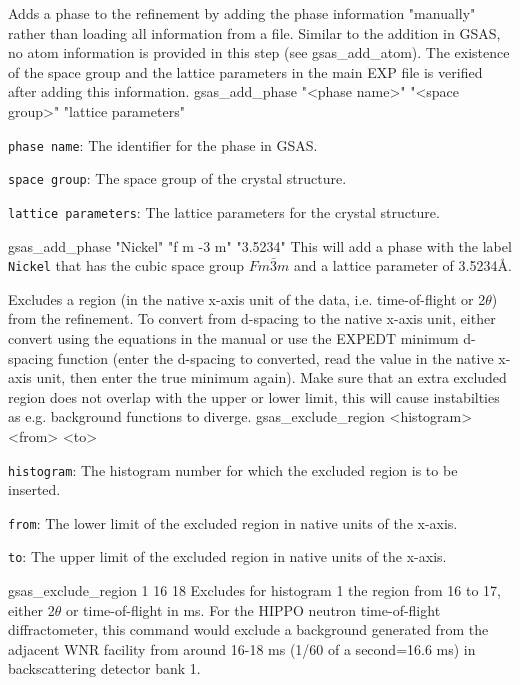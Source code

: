 {
Adds a phase to the refinement by adding the phase information "manually" rather than loading all information from a file. Similar to the addition in GSAS, no atom information is provided in this step (see gsas\_add\_atom). The existence of the space group and the lattice parameters in the main EXP file is verified after adding this information.
}{
gsas\_add\_phase "<phase name>" "<space group>" "lattice parameters"
}{
\item \texttt{phase name}: The identifier for the phase in GSAS.
\item \texttt{space group}: The space group of the crystal structure.
\item \texttt{lattice parameters}: The lattice parameters for the crystal structure.
}{
gsas\_add\_phase "Nickel" "f m -3 m" "3.5234"
}{
This will add a phase with the label \texttt{Nickel} that has the cubic space group $Fm\bar{3}m$ and a lattice parameter of 3.5234\AA.
}

{
Excludes a region (in the native x-axis unit of the data, i.e. time-of-flight or 2$\theta$) from the refinement. To convert from d-spacing to the native x-axis unit, either convert using the equations in the manual or use the EXPEDT minimum d-spacing function (enter the d-spacing to converted, read the value in the native x-axis unit, then enter the true minimum again). Make sure that an extra excluded region does not overlap with the upper or lower limit, this will cause instabilties as e.g. background functions to diverge.
}{
gsas\_exclude\_region <histogram> <from> <to>
}{
\item \texttt{histogram}: The histogram number for which the excluded region is to be inserted.
\item \texttt{from}: The lower limit of the excluded region in native units of the x-axis.
\item \texttt{to}: The upper limit of the excluded region in native units of the x-axis.
}{
gsas\_exclude\_region 1 16 18
}{
Excludes for histogram 1 the region from 16 to 17, either 2$\theta$ or time-of-flight in ms. For the HIPPO neutron time-of-flight diffractometer, this command would exclude a background generated from the adjacent WNR facility from around 16-18 ms (1/60 of a second=16.6 ms) in backscattering detector bank 1.
}

